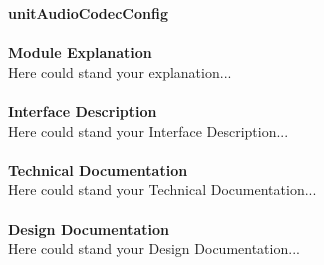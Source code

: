 \documentclass[../../../../doc/ASP-SoC_doc/main.tex]{subfiles}
\begin{document}
\textbf{unitAudioCodecConfig}
\\\\
\textbf{Module Explanation}
\\
Here could stand your explanation...\\
\\
\textbf{Interface Description}
\\
Here could stand your Interface Description...\\
\\
\textbf{Technical Documentation}
\\
Here could stand your Technical Documentation...\\
\\
\textbf{Design Documentation}
\\
Here could stand your Design Documentation...\\
\\
\end{document}
